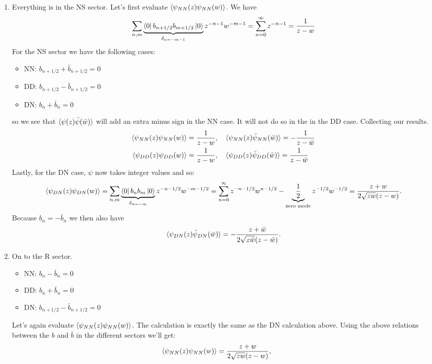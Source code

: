 \documentclass[11pt]{article}
\begin{document}
\begin{enumerate}
	\item Everything is in the NS sector. Let's first evaluate $\braket{\psi_{NN}(z) \psi_{NN} (w)}$. We have
	\[
		\sum_{n,m} \underbrace{\bra{0} b_{n+1/2} b_{m+1/2} \ket{0}}_{\delta_{n=-m-1}} z^{-n-1} w^{-m-1} = \sum_{n=0}^\infty z^{-n-1} = \frac{1}{z-w}
	\]
	For the NS sector we have the following cases:
	\begin{itemize}
		\item NN: $b_{n+1/2} + \bar b_{n+1/2} = 0$
		\item DD: $b_{n+1/2} -\bar b_{n+1/2} = 0$
		\item DN: $b_n + \bar b_n = 0$
	\end{itemize}
	so we see that $\braket{\psi(z) \bar \psi(\bar w)}$ will add an extra minus sign in the NN case. It will not do so in the in the DD case. Collecting our results. 
	\[
	\begin{aligned}
		\braket{\psi_{NN}(z) \psi_{NN} (w)} &= \frac{1}{z-w}, \quad 
		\braket{\psi_{NN}(z) \bar \psi_{NN} (\bar w)} = -\frac{1}{z-\bar w} \\
		\braket{\psi_{DD}(z) \psi_{DD} (w)} &= \frac{1}{z-w}, \quad 
		\braket{\psi_{DD}(z) \bar \psi_{DD} (\bar w)} = \frac{1}{z-\bar w}\\
	\end{aligned}
	\]
	Lastly, for the DN case, $\psi$ now takes integer values and so:
	\[
		\braket{\psi_{DN}(z) \psi_{DN} (w)} = \sum_{n, m} \underbrace{\bra{0} b_n b_m \ket{0}}_{\delta_{n=-m}} z^{-n-1/2} w^{-m-1/2} = \sum_{n=0}^\infty z^{-n-1/2} w^{n-1/2} - \underbrace{\frac12}_{\text{zero mode}} z^{-1/2} w^{-1/2} = \frac{z+w}{2 \sqrt{z w} (z - w)}.
	\]
	Because $b_n = -\bar b_n$ we then also have
	\[
		\braket{\psi_{DN}(z) \bar \psi_{DN} (\bar w)} = - \frac{z+\bar w}{2 \sqrt{z \bar w} (z - \bar w)}.
	\]
	\item 
	On to the R sector.
	\begin{itemize}
		\item NN: $b_{n} - \bar b_n = 0$
		\item DD: $b_{n} + \bar b_n = 0$
		\item DN: $b_{n+1/2} - \bar b_{n+1/2} = 0$
	\end{itemize}
	 Let's again evaluate $\braket{\psi_{NN}(z) \psi_{NN} (w)}$. The calculation is exactly the same as the DN calculation above. Using the above relations between the $b$ and $\bar b$ in the different sectors we'll get:
	\[
	\begin{aligned}
		\braket{\psi_{NN}(z) \psi_{NN} (w)} &= \frac{z+w}{2 \sqrt{z w} (z - w)}, \quad 

\end{aligned}\]
\end{enumerate}
\end{document}
